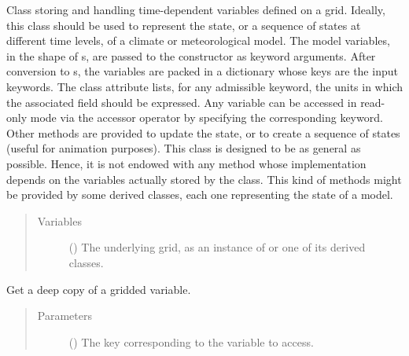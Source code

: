 \documentclass[letterpaper,10pt,english]{sphinxmanual}
\begin{document}
\begin{fulllineitems}
\label{\detokenize{api:storages.grid_data.GridData}}
Class storing and handling time-dependent variables defined on a grid. Ideally, this class should be used to
represent the state, or a sequence of states at different time levels, of a  climate or meteorological model.
The model variables, in the shape of s, are passed to the constructor as keyword arguments.
After conversion to s, the variables are packed in a dictionary whose keys are the input keywords.
The class attribute  lists, for any admissible keyword, the units in which the associated field should
be expressed. Any variable can be accessed in read-only mode via the accessor operator by specifying the corresponding
keyword. Other methods are provided to update the state, or to create a sequence of states (useful for animation purposes).
This class is designed to be as general as possible. Hence, it is not endowed with any method whose
implementation depends on the variables actually stored by the class. This kind of methods might be provided by some
derived classes, each one representing the state of a  model.
\begin{quote}\begin{description}
\item[{Variables}] \leavevmode
{} () \textendash{} The underlying grid, as an instance of {\hyperref[\detokenize{api:grids.grid_xyz.GridXYZ}]{}} or one of its derived classes.

\end{description}\end{quote}

\begin{fulllineitems}
\label{\detokenize{api:storages.grid_data.GridData.__getitem__}}
Get a deep copy of a gridded variable.
\begin{quote}\begin{description}
\item[{Parameters}] \leavevmode
{} () \textendash{} The key corresponding to the variable to access.


\end{description}
\end{quote}
\end{fulllineitems}
\end{fulllineitems}
\end{document}
